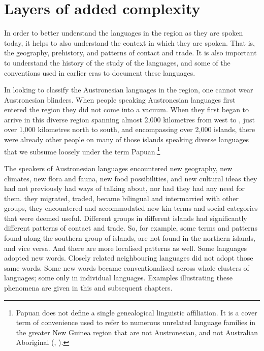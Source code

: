 \chapter{Layers of added complexity}\label{ch:LayAdd}
In order to better understand the languages in the region as they are spoken today,
it helps to also understand the context in which they are spoken.
That is, the geography,
prehistory, and patterns of contact and trade.
It is also important to understand the history of the study of the languages,
and some of the conventions used in earlier eras to document these languages.

In looking to classify the Austronesian languages in the region,
one cannot wear Austronesian blinders.
When people speaking Austronesian languages first entered the region they did not come into a vacuum.
When they first began to arrive in this diverse region spanning almost 2,000 kilometres from west to
, just over 1,000 kilometres north to south,
and encompassing over 2,000 islands,
there were already other people on many of those islands speaking diverse languages that we subsume loosely
under the term Papuan.\footnote{
		Papuan does not define a single genealogical linguistic affiliation.
		It is a cover term of convenience used to refer to numerous unrelated language families in the greater
		New Guinea region that are not Austronesian,
		and not Australian Aboriginal
		(\citealp{Foley1986}, \citealp[1]{Klamer2017}).}

The speakers of Austronesian languages encountered new geography,
new climates, new flora
and fauna, new food possibilities, and new cultural ideas they had not previously had ways of talking
about, nor had they had any need for them.
 they migrated, traded,
became bilingual and intermarried with other groups,
they encountered and accommodated new kin terms
and social categories that were deemed useful.
Different groups in different islands had significantly different patterns of contact and trade.
So, for example, some terms
and patterns found along the southern group of islands,
are not found in the northern islands, and vice versa.
And there are more localised patterns as well.
Some languages adopted new words.
Closely related neighbouring languages did not adopt those same words.
Some new words became conventionalised across whole clusters of languages; some only in individual languages.
Examples illustrating these phenomena are given in this and subsequent chapters.

